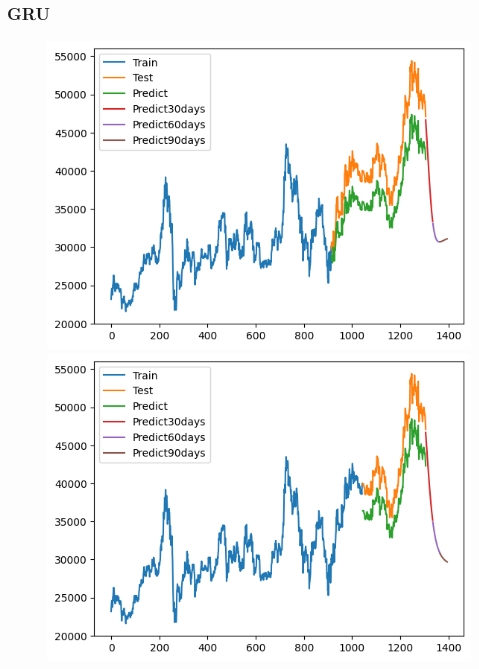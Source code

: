 \subsubsection{GRU}
\begin{figure}[H]
    \centering
    \begin{minipage}{0.15\textwidth}
    \centering
    \includegraphics[width=1\textwidth]{resources/chapter-5/newdata1/result/BIDV_GRU_7_3.png}
    \end{minipage}
    \hfill
    \begin{minipage}{0.15\textwidth}
    \centering
    \includegraphics[width=1\textwidth]{resources/chapter-5/newdata1/result/BIDV_GRU_8_2.png}
    \end{minipage}
    \hfill
        \begin{minipage}{0.15\textwidth}

\end{minipage}
\end{figure}
